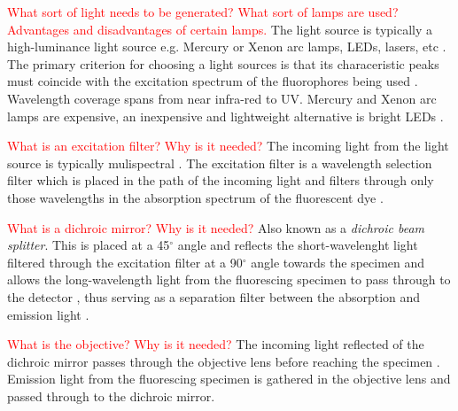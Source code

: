 \begin{definition}
	\textcolor{red}{What sort of light needs to be generated? What sort of lamps are used? Advantages and disadvantages of certain lamps.}
	The light source is typically a high-luminance light source e.g. Mercury or Xenon arc lamps, LEDs, lasers, etc  \citep{Danek2012,Hubeny2008,Aswani2012,Rice2016,ThermoFisher2016}.
	The primary criterion for choosing a light sources is that its characeristic peaks must coincide with the excitation spectrum of the fluorophores being used \citep{LichtmanConchello2005,Spring2003,Fatima2008}.
	Wavelength coverage spans from near infra-red to UV. Mercury and Xenon arc lamps are expensive, an inexpensive and lightweight alternative is bright LEDs \citep{Fatima2008,Dobrucki2013,Aswani2012,Koch1972}.
\end{definition}

\begin{definition}
	\textcolor{red}{What is an excitation filter? Why is it needed?}
	The incoming light from the light source is typically mulispectral \citep{SpringDavisdson2016}. 
	The excitation filter is a wavelength selection filter which is placed in the path of the incoming light and filters through only those wavelengths in the absorption spectrum of the fluorescent dye \citep{ThermoFisher2016,Danek2012,Hubeny2008,LichtmanConchello2005,Spring2003,CudeBurke2014,Fatima2008,Dobrucki2013}.
\end{definition}

\begin{definition}
	\textcolor{red}{What is a dichroic mirror? Why is it needed?}
	Also known as a \textit{dichroic beam splitter}.
	This is placed at a 45$^{\circ}$ angle and reflects the short-wavelenght light filtered through the excitation filter at a 90$^{\circ}$ angle towards the specimen \citep{Danek2012,Hubeny2008,Spring2003,CudeBurke2014} and allows the long-wavelength light from the fluorescing specimen to pass through to the detector \citep{LichtmanConchello2005,Koch1972}, thus serving as a separation filter between the absorption and emission light \citep{Fatima2008,Dobrucki2013}.
\end{definition}

\begin{definition}[Objective]
	\textcolor{red}{What is the objective? Why is it needed?}
	The incoming light reflected of the dichroic mirror passes through the objective lens before reaching the specimen \citep{Danek2012,Hubeny2008,LichtmanConchello2005,Spring2003}.
	Emission light from the fluorescing specimen is gathered in the objective lens and passed through to the dichroic mirror.
\end{definition}

